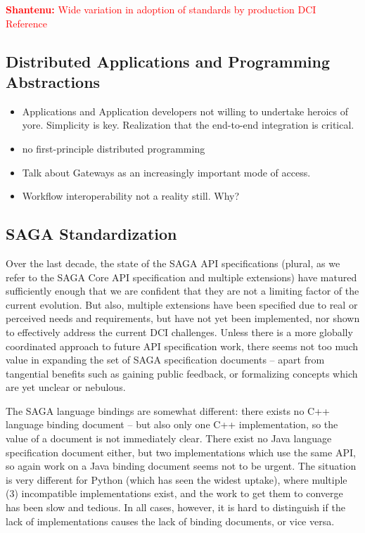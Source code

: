 \documentclass[]{article}
\newcommand{\B}[1]{\textbf{#1}}
\newcommand{\jhanote}[1]{{\textcolor{red}{     \B{Shantenu:} #1 }}}
\newcommand{\jhanote}[1]{}
\begin{document}
  \jhanote{Wide variation in adoption of standards by production DCI
  Reference~\cite{dpa-pdci-tr}}

   
\subsection{Distributed Applications and Programming Abstractions}

 \begin{itemize}
 \item Applications and Application developers not willing to
   undertake heroics of yore. Simplicity is key. Realization that the
   end-to-end integration is critical.
 \item no first-principle distributed programming
 \item Talk about Gateways as an increasingly important mode of
   access. 
 \item Workflow interoperability not a reality still. Why?
 \end{itemize}

 \subsection{SAGA Standardization}

  Over the last decade, the state of the SAGA API specifications
  (plural, as we refer to the SAGA Core API specification and multiple
  extensions) have matured sufficiently enough that we are confident
  that they are not a limiting factor of the current evolution.  But
  also, multiple extensions have been specified due to real or perceived
  needs and requirements, but have not yet been implemented, nor shown
  to effectively address the current DCI challenges.  Unless there is
  a more globally coordinated approach to future API specification work,
  there seems not too much value in expanding the set of SAGA
  specification documents -- apart from tangential benefits such as
  gaining public feedback, or formalizing concepts which are yet unclear
  or nebulous.

  The SAGA language bindings are somewhat different: there exists no C++
  language binding document -- but also only one C++ implementation, so
  the value of a document is not immediately clear.  There exist no Java
  language specification document either, but two implementations which
  use the same API, so again work on a Java binding document seems not
  to be urgent.  The situation is very different for Python (which has
  seen the widest uptake), where multiple (3) incompatible
  implementations exist, and the work to get them to converge has been
  slow and tedious.  In all cases, however, it is hard to distinguish if
  the lack of implementations causes the lack of binding documents, or
  vice versa.
  
\end{document}
